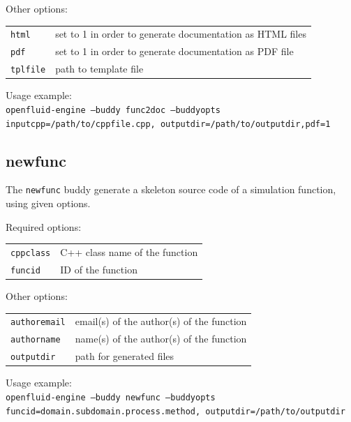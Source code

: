\noindent Other options:
\begin{center}
\begin{tabularx}{\linewidth}{lX}
\texttt{html}&set to 1 in order to generate documentation as HTML files\\
\texttt{pdf}&set to 1 in order to generate documentation as PDF file\\
\texttt{tplfile}&path to template file\\
\end{tabularx}
\end{center}

\bigskip

\noindent Usage example:\\
\texttt{openfluid-engine --buddy func2doc --buddyopts
inputcpp=/path/to/cppfile.cpp, outputdir=/path/to/outputdir,pdf=1}


\subsection{newfunc}

The \texttt{newfunc} buddy generate a skeleton source code of a simulation
function, using given options.

\bigskip

\noindent Required options:
\begin{center}
\begin{tabularx}{\linewidth}{lX}
\texttt{cppclass}&C++ class name of the function\\
\texttt{funcid}&ID of the function\\
\end{tabularx}
\end{center}
    
\noindent Other options:
\begin{center}
\begin{tabularx}{\linewidth}{lX}
\texttt{authoremail}&email(s) of the author(s) of the function\\
\texttt{authorname}&name(s) of the author(s) of the function\\
\texttt{outputdir}&path for generated files\\
\end{tabularx}
\end{center}

\bigskip

\noindent Usage example:\\
\texttt{openfluid-engine --buddy newfunc --buddyopts
funcid=domain.subdomain.process.method, outputdir=/path/to/outputdir}


